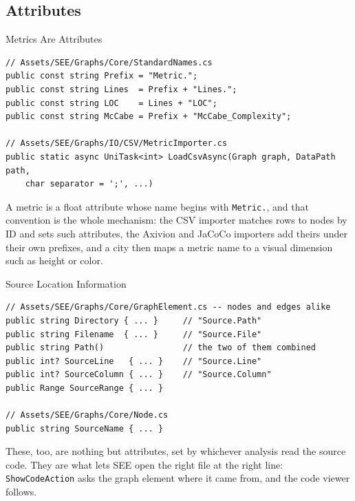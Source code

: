 \subsection{Attributes}

\begin{frame}[fragile]{Metrics Are Attributes}
  \begin{lstlisting}[basicstyle=\scriptsize\ttfamily]
// Assets/SEE/Graphs/Core/StandardNames.cs
public const string Prefix = "Metric.";
public const string Lines  = Prefix + "Lines.";
public const string LOC    = Lines + "LOC";
public const string McCabe = Prefix + "McCabe_Complexity";

// Assets/SEE/Graphs/IO/CSV/MetricImporter.cs
public static async UniTask<int> LoadCsvAsync(Graph graph, DataPath path,
    char separator = ';', ...)
  \end{lstlisting}
  \vspace{1ex}

  A metric is a float attribute whose name begins with \texttt{Metric.}, and
  that convention is the whole mechanism: the CSV importer matches rows to
  nodes by ID and sets such attributes, the Axivion and JaCoCo importers add
  theirs under their own prefixes, and a city then maps a metric name to a
  visual dimension such as height or color.
\end{frame}

\begin{frame}[fragile]{Source Location Information}
  \begin{lstlisting}[basicstyle=\scriptsize\ttfamily]
// Assets/SEE/Graphs/Core/GraphElement.cs -- nodes and edges alike
public string Directory { ... }     // "Source.Path"
public string Filename  { ... }     // "Source.File"
public string Path()                // the two of them combined
public int? SourceLine   { ... }    // "Source.Line"
public int? SourceColumn { ... }    // "Source.Column"
public Range SourceRange { ... }

// Assets/SEE/Graphs/Core/Node.cs
public string SourceName { ... }
  \end{lstlisting}
  \vspace{1ex}

  These, too, are nothing but attributes, set by whichever analysis read the
  source code. They are what lets SEE open the right file at the right line:
  \texttt{ShowCodeAction} asks the graph element where it came from, and the
  code viewer follows.
\end{frame}

